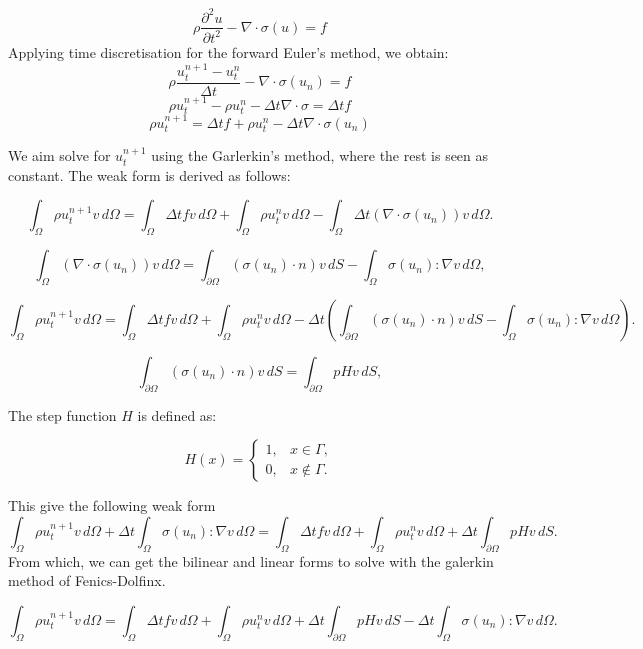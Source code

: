 \documentclass[a4paper,12pt]{article}
\begin{document}
$$ \rho \frac{\partial ^2 u}{\partial t^2} - \nabla \cdot \sigma(u) = f$$
Applying time discretisation for the forward Euler's method, we obtain:
$$ \rho \frac{u_t^{n+1} - u_t^n}{\Delta t} - \nabla \cdot \sigma(u_n) = f$$
$$ \rho u_t^{n+1} - \rho u_t^n - \Delta t\nabla \cdot \sigma = \Delta t f$$
$$ \rho u_t^{n+1} = \Delta t f + \rho u_t^n - \Delta t\nabla \cdot \sigma (u_n)$$

We aim solve for $u_t^{n+1}$ using the Garlerkin's method, where the rest is seen as constant. The weak form is derived as follows:

\[
	\int_\Omega \rho u_t^{n+1} v \, d\Omega = \int_\Omega \Delta t f v \, d\Omega + \int_\Omega \rho u_t^n v \, d\Omega - \int_\Omega \Delta t (\nabla \cdot \sigma(u_n)) v \, d\Omega.
\]

\[
	\int_\Omega (\nabla \cdot \sigma(u_n)) v \, d\Omega = \int_{\partial \Omega} (\sigma(u_n) \cdot n) v \, dS - \int_\Omega \sigma(u_n) : \nabla v \, d\Omega,
\]

\[
	\int_\Omega \rho u_t^{n+1} v \, d\Omega = \int_\Omega \Delta t f v \, d\Omega + \int_\Omega \rho u_t^n v \, d\Omega - \Delta t \left( \int_{\partial \Omega} (\sigma(u_n) \cdot n) v \, dS - \int_\Omega \sigma(u_n) : \nabla v \, d\Omega \right).
\]

\[
	\int_{\partial \Omega} (\sigma(u_n) \cdot n) v \, dS = \int_{\partial \Omega} p H v \, dS,
\]

The step function \( H \) is defined as:

\[
	H(x) =
	\begin{cases}
		1, & x \in \Gamma,    \\
		0, & x \notin \Gamma.
	\end{cases}
\]

This give the following weak form
\[
	\int_\Omega \rho u_t^{n+1} v \, d\Omega + \Delta t \int_\Omega \sigma(u_n) : \nabla v \, d\Omega = \int_\Omega \Delta t f v \, d\Omega + \int_\Omega \rho u_t^n v \, d\Omega + \Delta t \int_{\partial \Omega} p H v \, dS.
\]
\newpage
From which, we can get the bilinear and linear forms to solve with the galerkin method of Fenics-Dolfinx. \cite{dolfinx}

\[
	\int_\Omega \rho u_t^{n+1} v \, d\Omega = \int_\Omega \Delta t f v \, d\Omega + \int_\Omega \rho u_t^n v \, d\Omega + \Delta t \int_{\partial \Omega} p H v \, dS - \Delta t \int_\Omega \sigma(u_n) : \nabla v \, d\Omega.
\]
\end{document}
